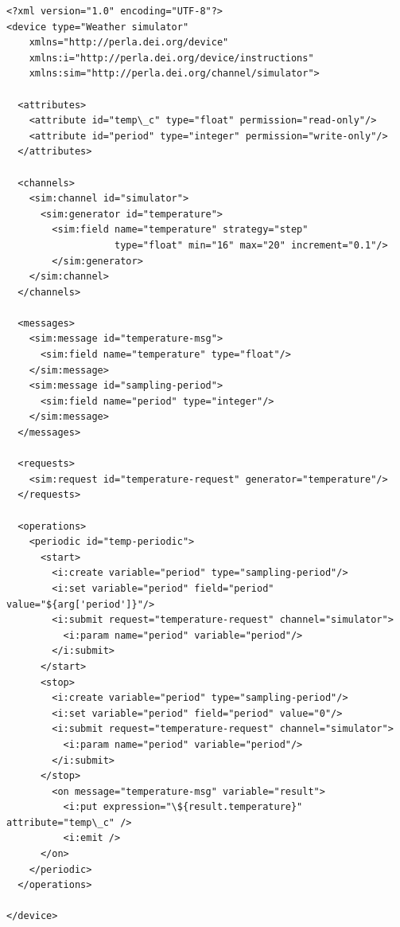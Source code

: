 \lstset{language=XML}
\begin{lstlisting}
<?xml version="1.0" encoding="UTF-8"?>
<device type="Weather simulator"
    xmlns="http://perla.dei.org/device"
    xmlns:i="http://perla.dei.org/device/instructions"
    xmlns:sim="http://perla.dei.org/channel/simulator">

  <attributes>
    <attribute id="temp\_c" type="float" permission="read-only"/>
    <attribute id="period" type="integer" permission="write-only"/>
  </attributes>

  <channels>
    <sim:channel id="simulator">
      <sim:generator id="temperature">
        <sim:field name="temperature" strategy="step"
                   type="float" min="16" max="20" increment="0.1"/>
        </sim:generator>
    </sim:channel>
  </channels>
  
  <messages>
    <sim:message id="temperature-msg">
      <sim:field name="temperature" type="float"/>
    </sim:message>
    <sim:message id="sampling-period">
      <sim:field name="period" type="integer"/>
    </sim:message>
  </messages>
  
  <requests>
    <sim:request id="temperature-request" generator="temperature"/>
  </requests>
  
  <operations>
    <periodic id="temp-periodic">
      <start>
        <i:create variable="period" type="sampling-period"/>
        <i:set variable="period" field="period" value="${arg['period']}"/>
        <i:submit request="temperature-request" channel="simulator">
          <i:param name="period" variable="period"/>
        </i:submit>
      </start>
      <stop>
        <i:create variable="period" type="sampling-period"/>
        <i:set variable="period" field="period" value="0"/>
        <i:submit request="temperature-request" channel="simulator">
          <i:param name="period" variable="period"/>
        </i:submit>
      </stop>
        <on message="temperature-msg" variable="result">
          <i:put expression="\${result.temperature}" attribute="temp\_c" />
          <i:emit />
      </on>
    </periodic>
  </operations>

</device>
\end{lstlisting}



